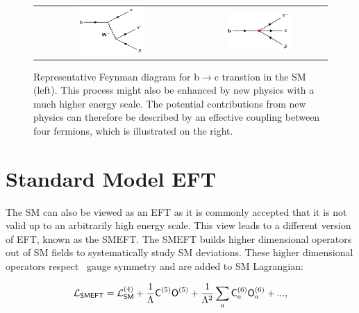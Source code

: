 \begin{figure}[tbh!]
 \begin{center}
 \begin{tabular}{cc}
 \includegraphics[width=0.45\textwidth]{figures/Part1/BSM/SMbtoc}&
 \includegraphics[width=0.5\textwidth]{figures/Part1/EFT/LEFT}
 \end{tabular}
 \caption{Representative Feynman diagram for b$\rightarrow$c transtion in the \ac{SM} (left). This process might also be enhanced by new physics with a much higher energy scale. The potential contributions from new physics can therefore be described by an effective coupling between four fermions, which is illustrated on the right.}
 \label{fig:LEFT}
 \end{center}
\end{figure}

\section{Standard Model EFT}
\label{sec:SMEFT}

The \ac{SM} can also be viewed as an \ac{EFT} as it is commonly accepted that it is not valid up to an arbitrarily high energy scale. This view leads to a different version of \ac{EFT}, known as the \ac{SMEFT}. The \ac{SMEFT} builds higher dimensional operators out of \ac{SM} fields to systematically study \ac{SM} deviations. These higher dimensional operators respect \sm~gauge symmetry and are added to \ac{SM} Lagrangian:

\begin{equation}
\label{eq:SMEFT}
\mathcal{L}_{\textsf{SMEFT}}=\mathcal{L}_{\textsf{SM}}^{(4)} + \frac{1}{\mathrm{\Lambda}}\textsf{C}^{(5)}_{}\textsf{O}^{(5)}_{}+ \frac{1}{\mathrm{\Lambda}^2}\sum_{a}\textsf{C}^{(6)}_{a}\textsf{O}^{(6)}_{a} + ...,
\end{equation}  


